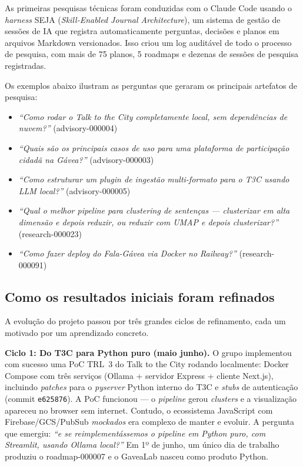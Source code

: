 \documentclass[12pt,a4paper]{article}
\begin{document}
As primeiras pesquisas técnicas foram conduzidas com o Claude Code usando o
\textit{harness} SEJA (\textit{Skill-Enabled Journal Architecture}), um sistema de
gestão de sessões de IA que registra automaticamente perguntas, decisões e planos em
arquivos Markdown versionados. Isso criou um log auditável de todo o processo de
pesquisa, com mais de 75 planos, 5 roadmaps e dezenas de sessões de pesquisa registradas.

Os exemplos abaixo ilustram as perguntas que geraram os principais artefatos de
pesquisa:

\begin{itemize}
  \item \textit{``Como rodar o Talk to the City completamente local, sem dependências de nuvem?''} (advisory-000004)
  \item \textit{``Quais são os principais casos de uso para uma plataforma de participação cidadã na Gávea?''} (advisory-000003)
  \item \textit{``Como estruturar um plugin de ingestão multi-formato para o T3C usando LLM local?''} (advisory-000005)
  \item \textit{``Qual o melhor pipeline para clustering de sentenças — clusterizar em alta dimensão e depois reduzir, ou reduzir com UMAP e depois clusterizar?''} (research-000023)
  \item \textit{``Como fazer deploy do Fala-Gávea via Docker no Railway?''} (research-000091)
\end{itemize}


\subsection{Como os resultados iniciais foram refinados}

A evolução do projeto passou por três grandes ciclos de refinamento, cada um motivado
por um aprendizado concreto.

\textbf{Ciclo 1: Do T3C para Python puro (maio \textrightarrow{} junho).}
O grupo implementou com sucesso uma PoC TRL~3 do Talk to the City rodando localmente:
Docker Compose com três serviços (Ollama + servidor Express + cliente Next.js), incluindo
\textit{patches} para o \textit{pyserver} Python interno do T3C e \textit{stubs} de
autenticação (commit \texttt{e625876}). A PoC funcionou — o \textit{pipeline} gerou
\textit{clusters} e a visualização apareceu no browser sem internet. Contudo, o
ecossistema JavaScript com Firebase/GCS/PubSub \textit{mockados} era complexo de manter
e evoluir. A pergunta que emergiu: \textit{``e se reimplementássemos o pipeline em Python
puro, com Streamlit, usando Ollama local?''} Em 1º de junho, um único dia de trabalho
produziu o roadmap-000007 e o GaveaLab nasceu como produto Python.
\end{document}
